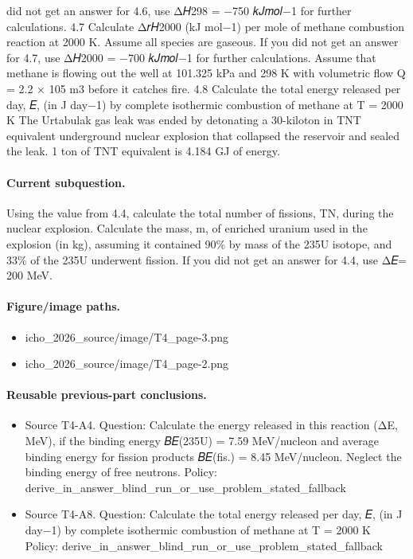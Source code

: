 did not get an answer for 4.6, use Δ𝐻298 = −750 𝑘𝐽𝑚𝑜𝑙−1 for further calculations. 4.7 Calculate Δ𝑟𝐻2000 (kJ mol−1) per mole of methane combustion reaction at 2000 K. Assume all species are gaseous. If you did not get an answer for 4.7, use Δ𝐻2000 = −700 𝑘𝐽𝑚𝑜𝑙−1 for further calculations. Assume that methane is flowing out the well at 101.325 kPa and 298 K with volumetric flow Q = 2.2 × 105 m3 before it catches fire. 4.8 Calculate the total energy released per day, 𝐸, (in J day−1) by complete isothermic combustion of methane at T = 2000 K The Urtabulak gas leak was ended by detonating a 30-kiloton in TNT equivalent underground nuclear explosion that collapsed the reservoir and sealed the leak. 1 ton of TNT equivalent is 4.184 GJ of energy.

\paragraph{Current subquestion.}
Using the value from 4.4, calculate the total number of fissions, TN, during the nuclear explosion. Calculate the mass, m, of enriched uranium used in the explosion (in kg), assuming it contained 90\% by mass of the 235U isotope, and 33\% of the 235U underwent fission. If you did not get an answer for 4.4, use Δ𝐸= 200 MeV.

\paragraph{Figure/image paths.}
\begin{itemize}
\item icho\_2026\_source/image/T4\_page-3.png
\item icho\_2026\_source/image/T4\_page-2.png
\end{itemize}

\paragraph{Reusable previous-part conclusions.}
\begin{itemize}
\item Source T4-A4. Question: Calculate the energy released in this reaction (ΔE, MeV), if the binding energy 𝐵𝐸(235U) = 7.59 MeV/nucleon and average binding energy for fission products 𝐵𝐸(fis.) = 8.45 MeV/nucleon. Neglect the binding energy of free neutrons. Policy: derive\_in\_answer\_blind\_run\_or\_use\_problem\_stated\_fallback
\item Source T4-A8. Question: Calculate the total energy released per day, 𝐸, (in J day−1) by complete isothermic combustion of methane at T = 2000 K Policy: derive\_in\_answer\_blind\_run\_or\_use\_problem\_stated\_fallback
\end{itemize}

